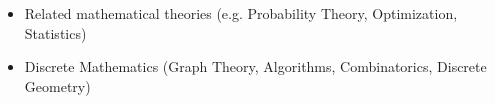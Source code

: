 \documentclass[10pt,a4]{article}
\begin{document}
\begin{small}
\begin{itemize}{}{}
\item Related mathematical theories (e.g. Probability Theory, Optimization, Statistics)

\item Discrete Mathematics (Graph Theory, Algorithms, Combinatorics, Discrete Geometry)
\end{itemize}
%
%
%
%	

\end{small}
\end{document}
